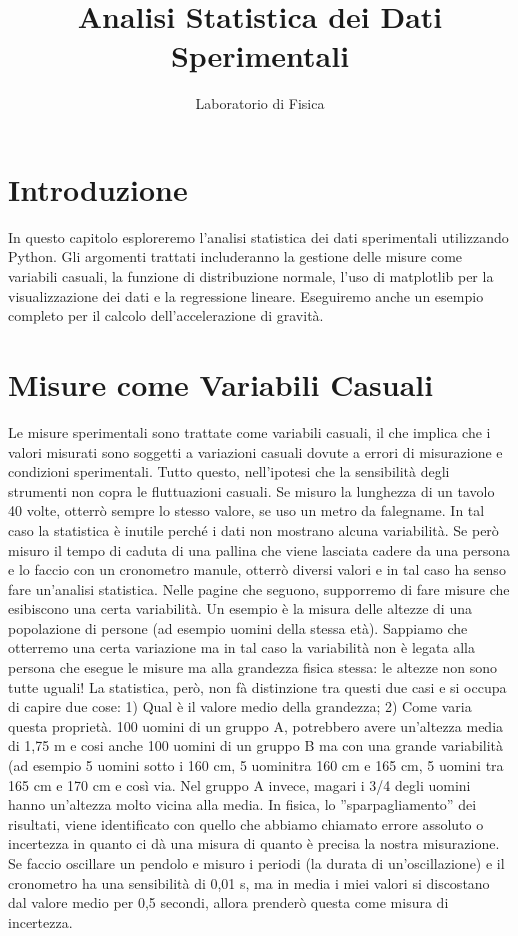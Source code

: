 \documentclass[a4paper,12pt]{article}
\title{Analisi Statistica dei Dati Sperimentali}
\author{Laboratorio di Fisica}
\date{}
\begin{document}
\maketitle

\section{Introduzione}
In questo capitolo esploreremo l'analisi statistica dei dati sperimentali utilizzando Python. Gli argomenti trattati includeranno la gestione delle misure come variabili casuali, la funzione di distribuzione normale, l'uso di matplotlib per la visualizzazione dei dati e la regressione lineare. Eseguiremo anche un esempio completo per il calcolo dell'accelerazione di gravità.

\section{Misure come Variabili Casuali}
Le misure sperimentali sono trattate come variabili casuali, il che implica che i valori misurati sono soggetti a variazioni casuali dovute a errori di misurazione e condizioni sperimentali. Tutto questo, nell'ipotesi che la sensibilità degli strumenti non copra le fluttuazioni casuali. Se misuro la lunghezza di un tavolo 40 volte, otterrò sempre lo stesso valore, se uso un metro da falegname. In tal caso la statistica è inutile perché i dati non mostrano alcuna variabilità. Se però misuro il tempo di caduta di una pallina che viene lasciata cadere da una persona e lo faccio con un cronometro manule, otterrò diversi valori e in tal caso ha senso fare un'analisi statistica. Nelle pagine che seguono, supporremo di fare misure che esibiscono una certa variabilità. Un esempio è la misura delle altezze di una popolazione di persone (ad esempio uomini della stessa età). Sappiamo che otterremo una certa variazione ma in tal caso la variabilità non è legata alla persona che esegue le misure ma alla grandezza fisica stessa: le altezze non sono tutte uguali! La statistica, però, non fà distinzione tra questi due casi e si occupa di capire due cose: 1) Qual è il valore medio della grandezza; 2) Come varia questa proprietà. 100 uomini di un gruppo A, potrebbero avere un'altezza media di 1,75 m e cosi anche 100 uomini di un gruppo B ma con una grande variabilità (ad esempio 5 uomini sotto i 160 cm, 5 uominitra 160 cm e 165 cm, 5 uomini tra 165 cm e 170 cm e così via. Nel gruppo A invece, magari i 3/4 degli uomini hanno un'altezza molto vicina alla media. In fisica, lo ''sparpagliamento'' dei risultati, viene identificato con quello che abbiamo chiamato errore assoluto o incertezza in quanto ci dà una misura di quanto è precisa la nostra misurazione. Se faccio oscillare un pendolo e misuro i periodi (la durata di un'oscillazione) e il cronometro ha una sensibilità di 0,01 s, ma in media i miei valori si discostano dal valore medio per 0,5 secondi, allora prenderò questa come misura di incertezza.
\end{document}
